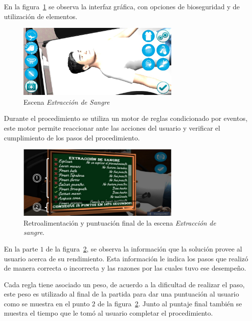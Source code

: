 En la figura~\ref{fig:hemocultivo_gui} se observa la interfaz gráfica, con
opciones de bioseguridad y de utilización de elementos.

\begin{figure}
\centering
\includegraphics[width=8cm]{../solucion/images/hemocultivo_gui.jpg}
\caption{Escena \emph{Extracción de Sangre}}
\label{fig:hemocultivo_gui}
\end{figure}

Durante el procedimiento se utiliza un motor de reglas condicionado por
eventos\cite{bailey2004event,behrends2006combining}, este motor permite
reaccionar ante las acciones del usuario y verificar el cumplimiento de los
pasos del procedimiento. 

\begin{figure}
\centering 
\includegraphics[width=8cm]{../solucion/images/hemocultivo_retroalimentacion.jpg}
\caption{Retroalimentación y puntuación final de la escena \emph{Extracción de
        sangre}.}
\label{fig:hemocultivo_retroalimentacion}
\end{figure}

En la parte $1$ de la figura~\ref{fig:hemocultivo_retroalimentacion}, se observa
la información que la solución provee al usuario acerca de su rendimiento. Esta
información le indica los pasos que realizó de manera correcta o incorrecta y
las razones por las cuales tuvo ese desempeño.

Cada regla tiene asociado un peso, de acuerdo a la dificultad de realizar el
paso, este peso es utilizado al final de la partida para dar una puntuación al
usuario como se muestra en el punto $2$ de la
figura~\ref{fig:hemocultivo_retroalimentacion}. Junto al puntaje final también
se muestra el tiempo que le tomó al usuario completar el procedimiento.

